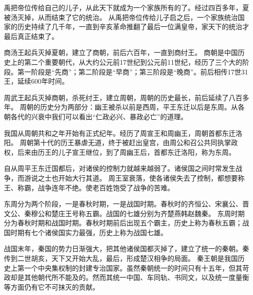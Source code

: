 \documentclass[avery5371,grid]{flashcards}
\begin{document}
{禹把帝位传给自己的儿子，从此天下就成为一个家族所有的了。经过四百多年，夏被汤灭掉，从而结束了它的统治。} %
{从禹把帝位传给儿子启之后，一个家族统治国家的历史持续了几千年，一直到辛亥革命推翻了最后一位满皇帝，家天下的统治才最后真正结束了。} %

{商汤王起兵灭掉夏朝，建立了商朝，前后六百年，一直到商纣王。} %
{商朝是中国历史上的第二个重要朝代，从大约公元前17世纪到公元前11世纪，经历了三个大的阶段。第一阶段是“先商”；第二阶段是“早商”；第三阶段是“晚商”。前后相传17世31王，延续600年时间。} %

{周武王起兵灭掉商朝，杀死纣王，建立周朝，周朝的历史最长，前后延续了八百多年。} %
{周朝的历史分为两部分：幽王被杀以前是西周，平王东迁以后是东周。从各朝各代的兴衰中我们可以看出“仁政必兴、暴政必亡”的道理。} %



{我国从周朝共和之年开始有正式纪年。经历了周宣王和周幽王，周朝首都东迁洛阳。} %
{周朝第十代的历王暴虐无道，终于被赶出皇宫，由周公和召公共同执掌政权，后来由历王的儿子宣王继位，到了周幽王后，首都东迁洛阳，称为东周。} %



{自从周平王东迁国都后，对诸侯的控制力就越来越弱了。诸侯国之间时常发生战争，而游说之士也开始大行其道。} %
{周王室衰落，使各诸侯失去了控制，都想要称王、称霸，战争连年不绝。使老百姓饱受了战争的苦难。} %

{东周分为两个阶段，一是春秋时期，一是战国时期。春秋时的齐恒公、宋襄公、晋文公、秦穆公和楚庄王号称五霸。战国的七雄分别为齐楚燕韩赵魏秦。} %
{东周时期分为春秋时期和战国时期。春秋时期前后出现五个霸主，历史上称为春秋五霸；战国时期有七个诸侯国实力最强，历史上称为战国七雄。} %

{战国末年，秦国的势力日渐强大，把其他诸侯国都灭掉了，建立了统一的秦朝。秦传到二世胡亥，天下又开始大乱，最后，形成楚汉相争的局面。} %
{秦王朝是我国历史上第一个中央集权制的封建专治国家。虽然秦朝统一的时间只有十五年，但其苛政却是其他朝代所不能及的。然而其统一中国、车同轨、书同文，以及统一度量衡等方面仍有它不可抹灭的贡献。} %
\end{document}
